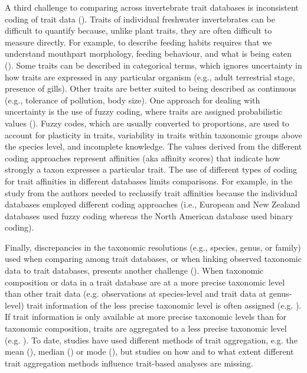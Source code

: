 \documentclass[12pt]{article}
\begin{document}
A third challenge to comparing across invertebrate trait databases is inconsistent coding of trait data (\cite{culp_incorporating_2011}). Traits of individual freshwater invertebrates can be difficult to quantify because, unlike plant traits, they are often difficult to measure directly. For example, to describe feeding habits requires that we understand mouthpart morphology, feeding behaviour, and what is being eaten (\cite{moogFaunaAquaticaAustriaca2017}). Some traits can be described in categorical terms, which ignores uncertainty in how traits are expressed in any particular organism (e.g., adult terrestrial stage, presence of gills). Other traits are better suited to being described as continuous (e.g., tolerance of pollution, body size). One approach for dealing with uncertainty is the use of fuzzy coding, where traits are assigned probabilistic values (\cite{chevenet_francois_fuzzy_1994}). Fuzzy codes, which are usually converted to proportions, are used to account for plasticity in traits, variability in traits within taxonomic groups above the species level, and incomplete knowledge. The values derived from the different coding approaches represent affinities (aka affinity scores) that indicate how strongly a taxon expresses a particular trait. The use of different types of coding for trait affinities in different databases limits comparisons. For example, in the study from \citet{brown_functional_2018} the authors needed to reclassify trait affinities because the individual databases employed different coding approaches (i.e., European and New Zealand databases used fuzzy coding whereas the North American database used binary coding). 

Finally, discrepancies in the taxonomic resolutions (e.g., species, genus, or family) used when comparing among trait databases, or when linking observed taxonomic data to trait databases, presents another challenge (\cite{gayraudInvertebrateTraitsBiomonitoring2003, doledecAccurateDescriptionAbundance2000}). When taxonomic composition or data in a trait database are at a more precise taxonomic level than other trait data (e.g. observations at species-level and trait data at genus-level) trait information of the less precise taxonomic level is often assigned (e.g. \cite{szocs_effects_2014, vos_taxonomic_2017}). If trait information is only available at more precise taxonomic levels than for taxonomic composition, traits are aggregated to a less precise taxonomic level (e.g. \cite{aspin_extreme_2019, piliere_a._f._h._importance_2016, poff_functional_2006, szocs_effects_2014}). To date, studies have used different methods of trait aggregation, e.g. the mean (\cite{magliozzi_functional_2019}), median (\cite{szocs_effects_2014}) or mode (\cite{piliere_a._f._h._importance_2016}), but studies on how and to what extent different trait aggregation methods influence trait-based analyses are missing. 
\end{document}
